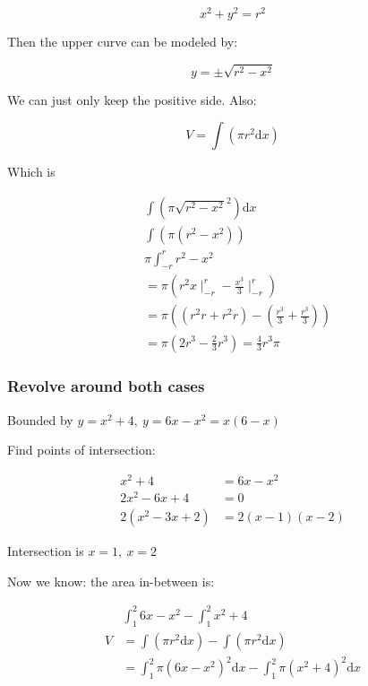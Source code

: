 \documentclass[12pt]{article}
\theoremstyle{plain}
\theoremstyle{remark}
\theoremstyle{definition}
\begin{document}
\[x^{2} + y^{2} = r^{2}\]

Then the upper curve can be modeled by:

\[y = \pm \sqrt{r^{2} - x^{2}}\]

We can just only keep the positive side. Also:

\[V = \int\left( \pi r^{2}\text{d}x \right)\]

Which is

\begin{align*}
&\int\left( \pi{\sqrt{r^{2} - x^{2}}}^{2} \right)\text{d}x \\
&\int\left( \pi\left( r^{2} - x^{2} \right) \right) \\
&\pi\int_{- r}^{r}{r^{2} - x^{2}} \\
&= \pi\left( r^{2}x \mid_{- r}^{r} - \frac{x^{3}}{3} \mid_{- r}^{r} \right) \\
&= \pi\left( \left( r^{2}r + r^{2}r \right) - \left( \frac{r^{3}}{3} + \frac{r^{3}}{3} \right) \right) \\
&= \pi\left( 2r^{3} - \frac{2}{3}r^{3} \right) = \frac{4}{3}r^{3}\pi
\end{align*}



\subsubsection{Revolve around both
cases}

Bounded by \(y = x^{2} + 4,\ y = 6x - x^{2} = x(6 - x)\)

Find points of intersection:

\begin{align*}
x^{2} + 4 &= 6x - x^{2} \\
2x^{2} - 6x + 4 &= 0 \\
2\left( x^{2} - 3x + 2 \right) &= 2(x - 1)(x - 2)
\end{align*}


Intersection is \(x = 1,\ x = 2\)

Now we know: the area in-between is:

\begin{align*}
&\int_{1}^{2}{6x - x^{2}} - \int_{1}^{2}{x^{2} + 4} \\
V &= \int\left( \pi r^{2}\text{d}x \right) - \int\left( \pi r^{2}\text{d}x \right) \\
&= \int_{1}^{2}{\pi\left( 6x - x^{2} \right)^{2}\text{d}x} - \int_{1}^{2}{\pi\left( x^{2} + 4 \right)^{2}\text{d}x}
\end{align*}
\end{document}
